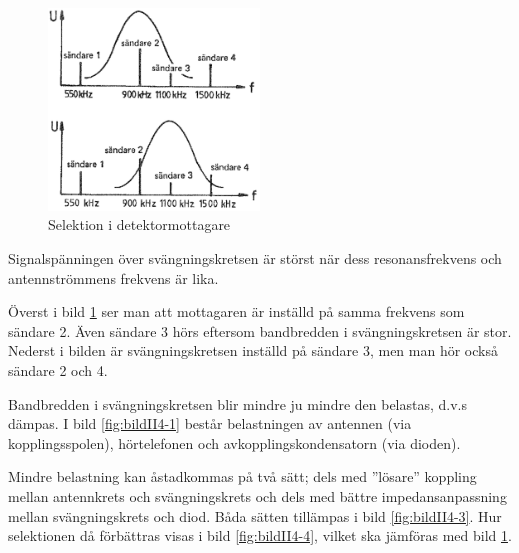 \begin{figure}
  \includegraphics[width=0.5\textwidth]{images/cropped_pdfs/bild_2_4-02.pdf}
  \caption{Selektion i detektormottagare}
  \label{fig:bildII4-2}
\end{figure}

Signalspänningen över svängningskretsen är störst när dess
resonansfrekvens och antennströmmens frekvens är lika.

Överst i bild \ref{fig:bildII4-2} ser man att mottagaren är inställd på
samma frekvens som sändare 2.
Även sändare 3 hörs eftersom bandbredden i svängningskretsen är stor.
Nederst i bilden är svängningskretsen inställd på sändare 3, men man hör
också sändare 2 och 4.

Bandbredden i svängningskretsen blir mindre ju mindre den belastas,
d.v.s dämpas.
I bild \ref{fig:bildII4-1} består belastningen av antennen (via
kopplingsspolen), hörtelefonen och avkopplingskondensatorn (via dioden).

Mindre belastning kan åstadkommas på två sätt; dels med ''lösare''
koppling mellan antennkrets och svängningskrets och dels med bättre
impedansanpassning mellan svängningskrets och diod. Båda sätten
tillämpas i bild \ref{fig:bildII4-3}. Hur selektionen då förbättras visas i
bild \ref{fig:bildII4-4}, vilket ska jämföras med bild \ref{fig:bildII4-2}.


